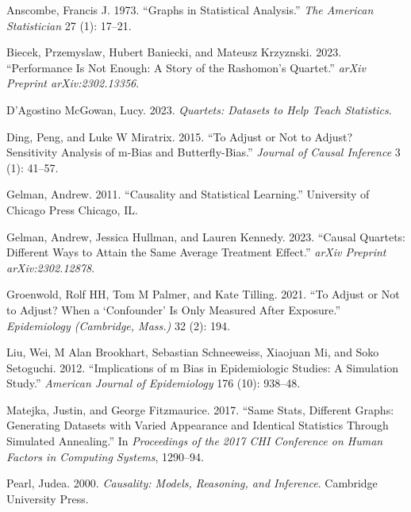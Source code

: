 \documentclass[
  letterpaper,
  DIV=11,
  numbers=noendperiod]{scrartcl}
\newlength{\cslhangindent}
\newlength{\cslentryspacingunit} %
\newenvironment{CSLReferences}[2] %
 {%
  \setlength{\parindent}{0pt}
  \ifodd #1
  \let\oldpar\par
  \def\par{\hangindent=\cslhangindent\oldpar}
  \fi
  \setlength{\parskip}{#2\cslentryspacingunit}
 }%
 {}
\begin{document}
\hypertarget{refs}{}
\begin{CSLReferences}{1}{0}
\leavevmode{}%
Anscombe, Francis J. 1973. {``Graphs in Statistical Analysis.''}
\emph{The American Statistician} 27 (1): 17--21.

\leavevmode{}%
Biecek, Przemyslaw, Hubert Baniecki, and Mateusz Krzyznski. 2023.
{``Performance Is Not Enough: A Story of the Rashomon's Quartet.''}
\emph{arXiv Preprint arXiv:2302.13356}.

\leavevmode{}%
D'Agostino McGowan, Lucy. 2023. \emph{Quartets: Datasets to Help Teach
Statistics}.

\leavevmode{}%
Ding, Peng, and Luke W Miratrix. 2015. {``To Adjust or Not to Adjust?
Sensitivity Analysis of m-Bias and Butterfly-Bias.''} \emph{Journal of
Causal Inference} 3 (1): 41--57.

\leavevmode{}%
Gelman, Andrew. 2011. {``Causality and Statistical Learning.''}
University of Chicago Press Chicago, IL.

\leavevmode{}%
Gelman, Andrew, Jessica Hullman, and Lauren Kennedy. 2023. {``Causal
Quartets: Different Ways to Attain the Same Average Treatment Effect.''}
\emph{arXiv Preprint arXiv:2302.12878}.

\leavevmode{}%
Groenwold, Rolf HH, Tom M Palmer, and Kate Tilling. 2021. {``To Adjust
or Not to Adjust? When a {`Confounder'} Is Only Measured After
Exposure.''} \emph{Epidemiology (Cambridge, Mass.)} 32 (2): 194.

\leavevmode{}%
Liu, Wei, M Alan Brookhart, Sebastian Schneeweiss, Xiaojuan Mi, and Soko
Setoguchi. 2012. {``Implications of m Bias in Epidemiologic Studies: A
Simulation Study.''} \emph{American Journal of Epidemiology} 176 (10):
938--48.

\leavevmode{}%
Matejka, Justin, and George Fitzmaurice. 2017. {``Same Stats, Different
Graphs: Generating Datasets with Varied Appearance and Identical
Statistics Through Simulated Annealing.''} In \emph{Proceedings of the
2017 CHI Conference on Human Factors in Computing Systems}, 1290--94.

\leavevmode{}%
Pearl, Judea. 2000. \emph{Causality: Models, Reasoning, and Inference}.
Cambridge University Press.


\end{CSLReferences}
\end{document}
